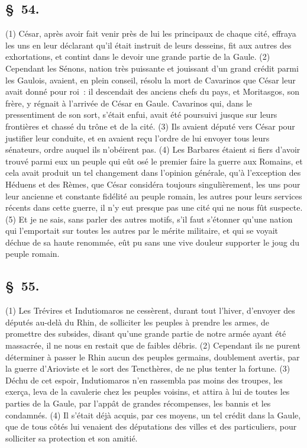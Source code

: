 \documentclass[french,twoside]{book} %
\begin{document}
\subsection[{§ 54.}]{ \textsc{§ 54.} }
\noindent (1) César, après avoir fait venir près de lui les principaux de chaque cité, effraya les uns en leur déclarant qu’il était instruit de leurs desseins, fit aux autres des exhortations, et contint dans le devoir une grande partie de la Gaule. (2) Cependant les Sénons, nation très puissante et jouissant d’un grand crédit parmi les Gaulois, avaient, en plein conseil, résolu la mort de Cavarinos que César leur avait donné pour roi : il descendait des anciens chefs du pays, et Moritasgos, son frère, y régnait à l’arrivée de César en Gaule. Cavarinos qui, dans le pressentiment de son sort, s’était enfui, avait été poursuivi jusque sur leurs frontières et chassé du trône et de la cité. (3) Ils avaient député vers César pour justifier leur conduite, et en avaient reçu l’ordre de lui envoyer tous leurs sénateurs, ordre auquel ils n’obéirent pas. (4) Les Barbares étaient si fiers d’avoir trouvé parmi eux un peuple qui eût osé le premier faire la guerre aux Romains, et cela avait produit un tel changement dans l’opinion générale, qu’à l’exception des Héduens et des Rèmes, que César considéra toujours singulièrement, les uns pour leur ancienne et constante fidélité au peuple romain, les autres pour leurs services récents dans cette guerre, il n’y eut presque pas une cité qui ne nous fût suspecte. (5) Et je ne sais, sans parler des autres motifs, s’il faut s’étonner qu’une nation qui l’emportait sur toutes les autres par le mérite militaire, et qui se voyait déchue de sa haute renommée, eût pu sans une vive douleur supporter le joug du peuple romain.
\subsection[{§ 55.}]{ \textsc{§ 55.} }
\noindent (1) Les Trévires et Indutiomaros ne cessèrent, durant tout l’hiver, d’envoyer des députés au-delà du Rhin, de solliciter les peuples à prendre les armes, de promettre des subsides, disant qu’une grande partie de notre armée ayant été massacrée, il ne nous en restait que de faibles débris. (2) Cependant ils ne purent déterminer à passer le Rhin aucun des peuples germains, doublement avertis, par la guerre d’Arioviste et le sort des Tencthères, de ne plus tenter la fortune. (3) Déchu de cet espoir, Indutiomaros n’en rassembla pas moins des troupes, les exerça, leva de la cavalerie chez les peuples voisins, et attira à lui de toutes les parties de la Gaule, par l’appât de grandes récompenses, les bannis et les condamnés. (4) Il s’était déjà acquis, par ces moyens, un tel crédit dans la Gaule, que de tous côtés lui venaient des députations des villes et des particuliers, pour solliciter sa protection et son amitié.
\end{document}
